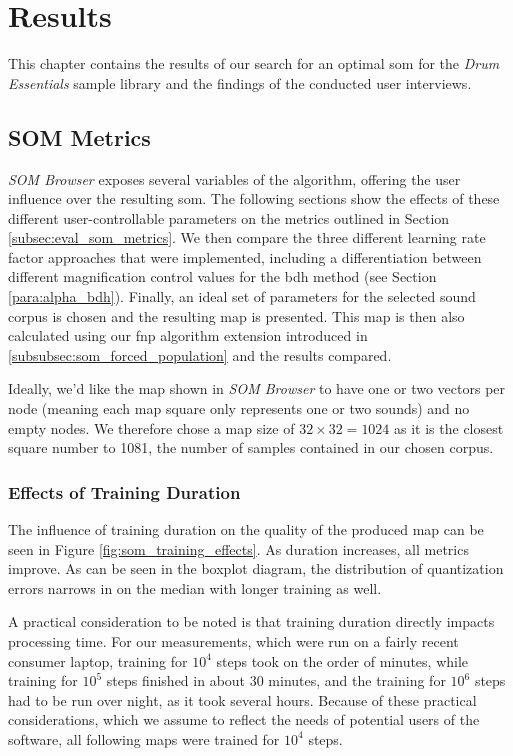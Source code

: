 
\section{Results}
\label{sec:results}
This chapter contains the results of our search for an optimal \gls{som} for the
\textit{Drum Essentials} sample library and the findings of the conducted user
interviews.

\subsection{SOM Metrics}
\label{subsec:results_som_metrics}
\textit{SOM Browser} exposes several variables of the algorithm, offering the
user influence over the resulting \gls{som}. The following sections show the
effects of these different user-controllable parameters on the metrics outlined
in Section \ref{subsec:eval_som_metrics}. We then compare the three different
learning rate factor approaches that were implemented, including a
differentiation between different magnification control values for the \gls{bdh}
method (see Section \ref{para:alpha_bdh}). Finally, an ideal set of parameters
for the selected sound corpus is chosen and the resulting map is presented. This
map is then also calculated using our \gls{fnp} algorithm extension introduced
in \ref{subsubsec:som_forced_population} and the results compared.

Ideally, we'd like the map shown in \textit{SOM Browser} to have one or two
vectors per node (meaning each map square only represents one or two sounds) and
no empty nodes. We therefore chose a map size of $32 \times 32 = 1024$ as it is
the closest square number to 1081, the number of samples contained in our chosen
corpus.

\subsubsection{Effects of Training Duration}
\label{subsubsec:som_training_effects}
The influence of training duration on the quality of the produced map can be
seen in Figure \ref{fig:som_training_effects}. As duration increases, all
metrics improve. As can be seen in the boxplot diagram, the distribution of
quantization errors narrows in on the median with longer training as well.

\smallskip

A practical consideration to be noted is that training duration directly impacts
processing time. For our measurements, which were run on a fairly recent
consumer laptop, training for $10^4$ steps took on the order of minutes, while
training for $10^5$ steps finished in about 30 minutes, and the training for
$10^6$ steps had to be run over night, as it took several hours. Because of
these practical considerations, which we assume to reflect the needs of
potential users of the software, all following maps were trained for $10^4$
steps.

